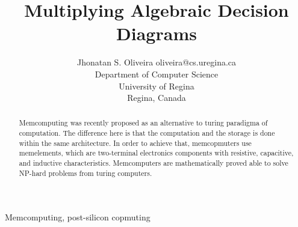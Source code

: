 \documentclass[twoside,11pt]{article}
\newcommand{\thistitle}{{Multiplying Algebraic Decision Diagrams}}
\begin{document}
\title{\thistitle}

\author{\name Jhonatan S. Oliveira \email oliveira@cs.uregina.ca \\
\addr Department of Computer Science \\
University of Regina \\ 
Regina, Canada
}


\maketitle

\begin{abstract}%
Memcomputing was recently proposed as an alternative to turing paradigma of computation.
The difference here is that the computation and the storage is done within the same architecture.
In order to achieve that, memcopmuters use memelements, which are two-terminal electronics components with resistive, capacitive, and inductive characteristics.
Memcomputers are mathematically proved able to solve NP-hard problems from turing computers.
\end{abstract}

\begin{keywords}
Memcomputing, post-silicon copmuting
\end{keywords}






\vskip 0.2in

\end{document}
